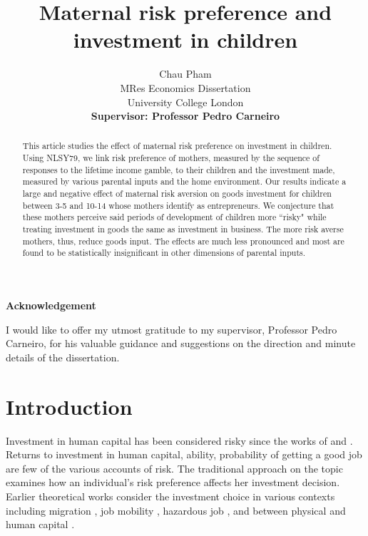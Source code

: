 \documentclass[emulatestandardclasses, 10pt, abstract = true]{scrartcl}
\title{Maternal risk preference and investment in children}
\author{Chau Pham\\ MRes Economics Dissertation \\ University College London \\ \textbf{Supervisor: Professor Pedro Carneiro}}
\begin{document}
\onehalfspacing

\begin{titlingpage}
\maketitle
\begin{abstract}
\noindent 
This article studies the effect of maternal risk preference on investment in children. Using NLSY79, we link risk preference of mothers, measured by the sequence of responses to the lifetime income gamble, to their children and the investment made, measured by various parental inputs and the home environment. Our results indicate a large and negative effect of maternal risk aversion on goods investment for children between 3-5 and 10-14 whose mothers identify as entrepreneurs. We conjecture that these mothers perceive said periods of development of children more ``risky" while treating investment in goods the same as investment in business. The more risk averse mothers, thus, reduce goods input. The effects are much less pronounced and most are found to be statistically insignificant in other dimensions of parental inputs.
\end{abstract}


\vspace{2em}
\begin{center}
	\begin{minipage}[!h]{.89\linewidth}\small
		\begin{center}
			\textbf{Acknowledgement}
		\end{center}
		\noindent I would like to offer my utmost gratitude to my supervisor, Professor Pedro Carneiro, for his valuable guidance and suggestions on the direction and minute details of the dissertation.
	\end{minipage}
\end{center}

\end{titlingpage}


\section{Introduction}
Investment in human capital has been considered risky since the works of \citet{becker1962investment, levhari1974effect} and \citet{schultz1971investment}. Returns to investment in human capital, ability, probability of getting a good job are few of the various accounts of risk. The traditional approach on the topic examines how an individual's risk preference affects her investment decision. Earlier theoretical works consider the investment choice in various contexts including migration \citep{david1974fortune}, job mobility \citep{johnson1978theory}, hazardous job \citep{thaler1976value}, and between physical and human capital \citep{levhari1974effect}. 
\end{document}
